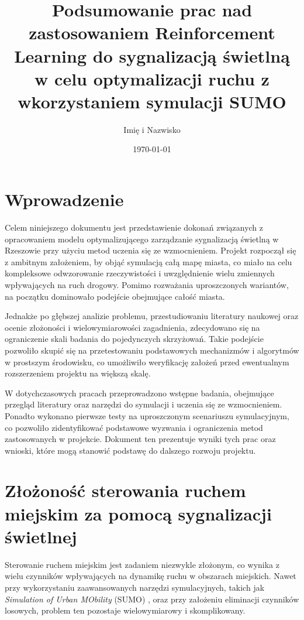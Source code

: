 \documentclass[12pt, a4paper]{article} %
\title
{Podsumowanie prac nad zastosowaniem Reinforcement Learning do sygnalizacją świetlną w celu optymalizacji
ruchu z wkorzystaniem symulacji SUMO}
\author{Imię i Nazwisko}
\date{\today}
\begin{document}
    \maketitle %

    \clearpage
    \tableofcontents
    \clearpage
    \section*{Wprowadzenie}



    Celem niniejszego dokumentu jest przedstawienie dokonań związanych z opracowaniem modelu optymalizującego
    zarządzanie sygnalizacją świetlną w Rzeszowie przy użyciu metod uczenia się ze wzmocnieniem. Projekt rozpoczął się z
    ambitnym założeniem, by objąć symulacją całą mapę miasta, co miało na celu kompleksowe odwzorowanie rzeczywistości i
    uwzględnienie wielu zmiennych wpływających na ruch drogowy. Pomimo rozważania uproszczonych wariantów, na początku
    dominowało podejście obejmujące całość miasta.

    Jednakże po głębszej analizie problemu, przestudiowaniu literatury naukowej oraz ocenie złożoności i
    wielowymiarowości zagadnienia, zdecydowano się na ograniczenie skali badania do pojedynczych skrzyżowań. Takie
    podejście pozwoliło skupić się na przetestowaniu podstawowych mechanizmów i algorytmów w prostszym środowisku, co
    umożliwiło weryfikację założeń przed ewentualnym rozszerzeniem projektu na większą skalę.

    W dotychczasowych pracach przeprowadzono wstępne badania, obejmujące przegląd literatury oraz narzędzi do symulacji
    i uczenia się ze wzmocnieniem. Ponadto wykonano pierwsze testy na uproszczonym scenariuszu symulacyjnym, co
    pozwoliło zidentyfikować podstawowe wyzwania i ograniczenia metod zastosowanych w projekcie. Dokument ten prezentuje
    wyniki tych prac oraz wnioski, które mogą stanowić podstawę do dalszego rozwoju projektu.


    \section{Złożoność sterowania ruchem miejskim za pomocą sygnalizacji świetlnej}

    Sterowanie ruchem miejskim jest zadaniem niezwykle złożonym, co wynika z wielu czynników wpływających na dynamikę
    ruchu w obszarach miejskich. Nawet przy wykorzystaniu zaawansowanych narzędzi symulacyjnych, takich jak
    \textit{Simulation of Urban MObility} (SUMO)
    , oraz przy założeniu eliminacji czynników losowych, problem ten pozostaje wielowymiarowy i skomplikowany.
\end{document}
